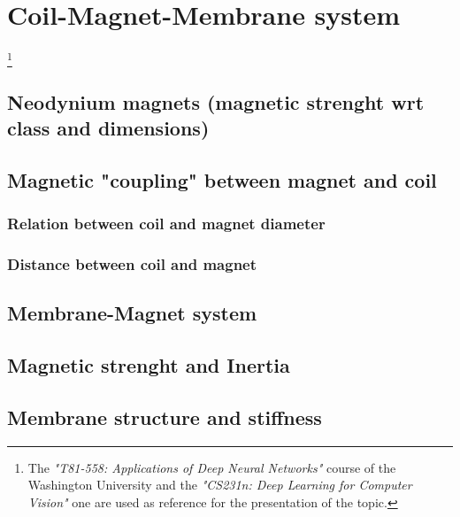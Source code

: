 \section{Coil-Magnet-Membrane system}\footnote{The \textit{"T81-558: Applications of Deep Neural Networks"} course of the Washington University \cite{T81-558} and the \textit{"CS231n: Deep Learning for Computer Vision"}\cite{CS231n} one are used as reference for the presentation of the topic.}

\subsection{Neodynium magnets (magnetic strenght wrt class and dimensions)}

\subsection{Magnetic "coupling" between magnet and coil}

\subsubsection{Relation between coil and magnet diameter}

\subsubsection{Distance between coil and magnet}

\subsection{Membrane-Magnet system}

\subsection{Magnetic strenght and Inertia}

\subsection{Membrane structure and stiffness}